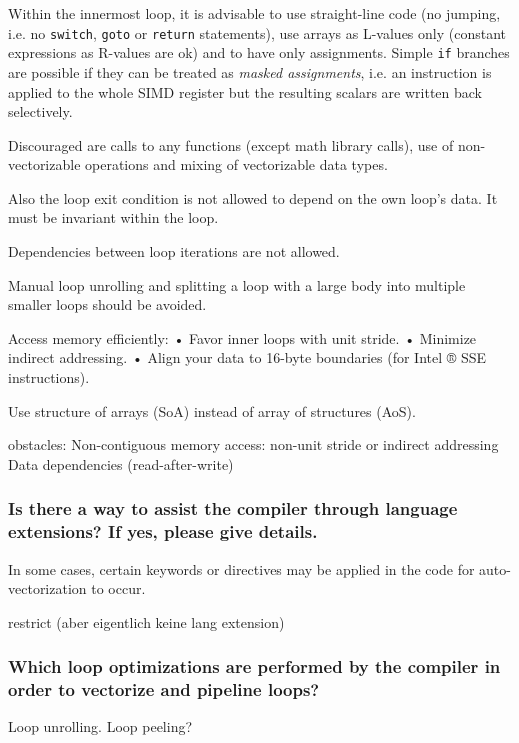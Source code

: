 \documentclass[11pt]{article}
\begin{document}
Within the innermost loop, it is advisable to use straight-line code (no jumping, i.e. no \texttt{switch}, \texttt{goto} or \texttt{return} statements), use arrays as L-values only (constant expressions as R-values are ok) and to have only assignments. Simple \texttt{if} branches are possible if they can be treated as \textit{masked assignments}, i.e. an instruction is applied to the whole SIMD register but the resulting scalars are written back selectively.

Discouraged are calls to any functions (except math library calls), use of non-vectorizable operations and mixing of vectorizable data types.

Also the loop exit condition is not allowed to depend on the own loop's data. It must be invariant within the loop.

Dependencies between loop iterations are not allowed.

Manual loop unrolling and splitting a loop with a large body into multiple smaller loops should be avoided.

Access memory efficiently:
• Favor inner loops with unit stride.
• Minimize indirect addressing.
• Align your data to 16-byte boundaries (for Intel ® SSE instructions).

Use structure of arrays (SoA) instead of array of structures (AoS).

obstacles:
Non-contiguous memory access: non-unit stride or indirect addressing
Data dependencies (read-after-write)


\subsubsection*{Is there a way to assist the compiler through language extensions? If yes, please give details.}
In some cases, certain keywords or directives may be applied in the code for auto-vectorization to occur.

restrict (aber eigentlich keine lang extension)

\subsubsection*{Which loop optimizations are performed by the compiler in order to vectorize and pipeline loops?}
Loop unrolling.
Loop peeling?
\end{document}
